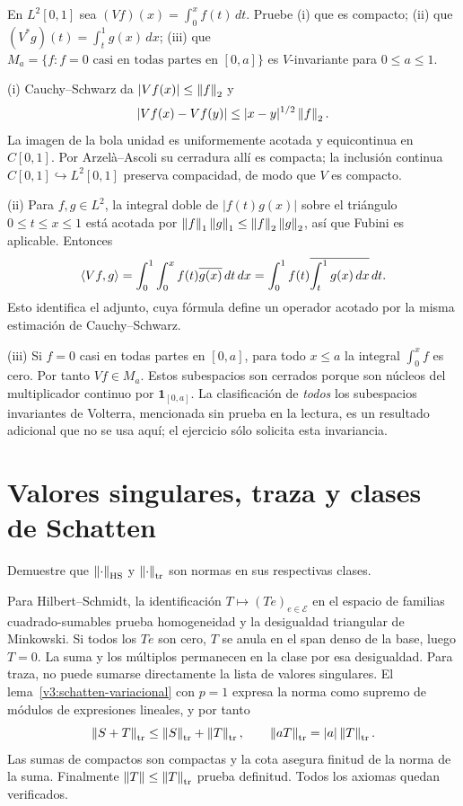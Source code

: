 \begin{ejercicio}[Volterra]\label{ej:v3-l11-5}
En $L^2[0,1]$ sea $(Vf)(x)=\int_0^xf(t)\,dt$. Pruebe (i) que es compacto; (ii) que $(V^*g)(t)=\int_t^1g(x)\,dx$; (iii) que $M_a=\{f:f=0\text{ casi en todas partes en }[0,a]\}$ es $V$-invariante para $0\le a\le1$.
\end{ejercicio}
\begin{solucion}
(i) Cauchy--Schwarz da $|Vf(x)|\le\left\lVert f\right\rVert_2$ y
\[|Vf(x)-Vf(y)|\le|x-y|^{1/2}\left\lVert f\right\rVert_2.
\]
La imagen de la bola unidad es uniformemente acotada y equicontinua en $C[0,1]$. Por Arzelà--Ascoli su cerradura allí es compacta; la inclusión continua $C[0,1]\hookrightarrow L^2[0,1]$ preserva compacidad, de modo que $V$ es compacto.

(ii) Para $f,g\in L^2$, la integral doble de $|f(t)g(x)|$ sobre el triángulo $0\le t\le x\le1$ está acotada por $\left\lVert f\right\rVert_1\left\lVert g\right\rVert_1\le\left\lVert f\right\rVert_2\left\lVert g\right\rVert_2$, así que Fubini es aplicable. Entonces
\[\left\langle Vf,g\right\rangle=\int_0^1\int_0^x f(t)\overline{g(x)}\,dt\,dx
=\int_0^1 f(t)\overline{\int_t^1g(x)\,dx}\,dt.
\]
Esto identifica el adjunto, cuya fórmula define un operador acotado por la misma estimación de Cauchy--Schwarz.

(iii) Si $f=0$ casi en todas partes en $[0,a]$, para todo $x\le a$ la integral $\int_0^xf$ es cero. Por tanto $Vf\in M_a$. Estos subespacios son cerrados porque son núcleos del multiplicador continuo por $\boldsymbol1_{[0,a]}$. La clasificación de \emph{todos} los subespacios invariantes de Volterra, mencionada sin prueba en la lectura, es un resultado adicional que no se usa aquí; el ejercicio sólo solicita esta invariancia.
\end{solucion}

\chapter{Valores singulares, traza y clases de Schatten}

\begin{ejercicio}\label{ej:v3-l12-1}
Demuestre que $\left\lVert\cdot\right\rVert_{\mathrm{HS}}$ y $\left\lVert\cdot\right\rVert_{\mathrm{tr}}$ son normas en sus respectivas clases.
\end{ejercicio}
\begin{solucion}
Para Hilbert--Schmidt, la identificación $T\mapsto(Te)_{e\in\mathcal E}$ en el espacio de familias cuadrado-sumables prueba homogeneidad y la desigualdad triangular de Minkowski. Si todos los $Te$ son cero, $T$ se anula en el span denso de la base, luego $T=0$. La suma y los múltiplos permanecen en la clase por esa desigualdad. Para traza, no puede sumarse directamente la lista de valores singulares. El lema~\ref{v3:schatten-variacional} con $p=1$ expresa la norma como supremo de módulos de expresiones lineales, y por tanto
\[\left\lVert S+T\right\rVert_{\mathrm{tr}}\le\left\lVert S\right\rVert_{\mathrm{tr}}+\left\lVert T\right\rVert_{\mathrm{tr}},\qquad
\left\lVert aT\right\rVert_{\mathrm{tr}}=|a|\left\lVert T\right\rVert_{\mathrm{tr}}.
\]
Las sumas de compactos son compactas y la cota asegura finitud de la norma de la suma. Finalmente $\left\lVert T\right\rVert\le\left\lVert T\right\rVert_{\mathrm{tr}}$ prueba definitud. Todos los axiomas quedan verificados.
\end{solucion}

